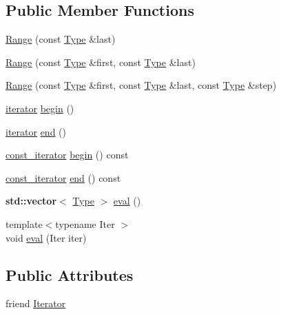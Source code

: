 \subsection*{Public Member Functions}
\begin{DoxyCompactItemize}
\item 
\hyperlink{classhandy_1_1Range_ac75e53eb61792ac1a682d51913633709}{Range} (const \hyperlink{classhandy_1_1Range_a2a8c2d169657c93464989e7608ed3f9b}{Type} \&last)
\item 
\hyperlink{classhandy_1_1Range_a9496d5be63390d116e8ac513941ad805}{Range} (const \hyperlink{classhandy_1_1Range_a2a8c2d169657c93464989e7608ed3f9b}{Type} \&first, const \hyperlink{classhandy_1_1Range_a2a8c2d169657c93464989e7608ed3f9b}{Type} \&last)
\item 
\hyperlink{classhandy_1_1Range_a6e6f90cfac8ae3c265c82d25e01bd0ba}{Range} (const \hyperlink{classhandy_1_1Range_a2a8c2d169657c93464989e7608ed3f9b}{Type} \&first, const \hyperlink{classhandy_1_1Range_a2a8c2d169657c93464989e7608ed3f9b}{Type} \&last, const \hyperlink{classhandy_1_1Range_a2a8c2d169657c93464989e7608ed3f9b}{Type} \&step)
\item 
\hyperlink{classhandy_1_1Range_ad879bbe314ce7bcffdda15a0f065e0f8}{iterator} \hyperlink{classhandy_1_1Range_ae6142e67b348d891966b97671acb890a}{begin} ()
\item 
\hyperlink{classhandy_1_1Range_ad879bbe314ce7bcffdda15a0f065e0f8}{iterator} \hyperlink{classhandy_1_1Range_a423264a5e77f59b8a47739e5d47f5e81}{end} ()
\item 
\hyperlink{classhandy_1_1Range_a776521ae1ca6a10d1be256ecdf26f6e2}{const\+\_\+iterator} \hyperlink{classhandy_1_1Range_a3e3e4186610dd72a275881e597285b8b}{begin} () const 
\item 
\hyperlink{classhandy_1_1Range_a776521ae1ca6a10d1be256ecdf26f6e2}{const\+\_\+iterator} \hyperlink{classhandy_1_1Range_a69e9c4ca833c91459594e71d3f83c3e8}{end} () const 
\item 
{\bf std\+::vector}$<$ \hyperlink{classhandy_1_1Range_a2a8c2d169657c93464989e7608ed3f9b}{Type} $>$ \hyperlink{classhandy_1_1Range_a7a0457913f0bc3698b6172910ca5070b}{eval} ()
\item 
{\footnotesize template$<$typename Iter $>$ }\\void \hyperlink{classhandy_1_1Range_aedef8b41234dd9832701619696fcd239}{eval} (Iter iter)
\end{DoxyCompactItemize}
\subsection*{Public Attributes}
\begin{DoxyCompactItemize}
\item 
friend \hyperlink{classhandy_1_1Range_a65634287fdb689e410c0c4af5bb2ec05}{Iterator}
\end{DoxyCompactItemize}


